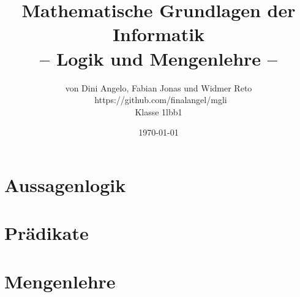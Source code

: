 \documentclass{article}
\title{Mathematische Grundlagen der Informatik \\ – Logik und Mengenlehre –}
\author{von Dini Angelo, Fabian Jonas und Widmer Reto \\ https://github.com/finalangel/mgli \\ Klasse 1lbb1}
\date{\today}
\begin{document}
\maketitle
\vspace{5mm}
\tableofcontents

\newpage


\newpage
\section{Aussagenlogik}


\newpage
\section{Prädikate}


\newpage
\section{Mengenlehre}

\end{document}
